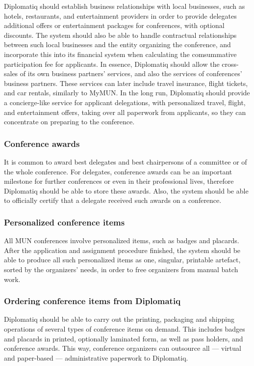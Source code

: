 Diplomatiq should establish business relationships with local businesses, such as hotels, restaurants, and entertainment providers in order to provide delegates additional offers or entertainment packages for conferences, with optional discounts. The system should also be able to handle contractual relationships between such local businesses and the entity organizing the conference, and incorporate this into its financial system when calculating the comsummative participation fee for applicants. In essence, Diplomatiq should allow the cross-sales of its own business partners' services, and also the services of conferences' business partners. These services can later include travel insurance, flight tickets, and car rentals, similarly to MyMUN. In the long run, Diplomatiq should provide a concierge-like service for applicant delegations, with personalized travel, flight, and entertainment offers, taking over all paperwork from applicants, so they can concentrate on preparing to the conference.

\subsubsection{Conference awards}

It is common to award best delegates and best chairpersons of a committee or of the whole conference. For delegates, conference awards can be an important milestone for further conferences or even in their professional lives, therefore Diplomatiq should be able to store these awards. Also, the system should be able to officially certify that a delegate received such awards on a conference.

\subsubsection{Personalized conference items}

All MUN conferences involve personalized items, such as badges and placards. After the application and assignment procedure finished, the system should be able to produce all such personalized items as one, singular, printable artefact, sorted by the organizers' needs, in order to free organizers from manual batch work.

\subsubsection{Ordering conference items from Diplomatiq}

Diplomatiq should be able to carry out the printing, packaging and shipping operations of several types of conference items on demand. This includes badges and placards in printed, optionally laminated form, as well as pass holders, and conference awards. This way, conference organizers can outsource all — virtual and paper-based — administrative paperwork to Diplomatiq.

